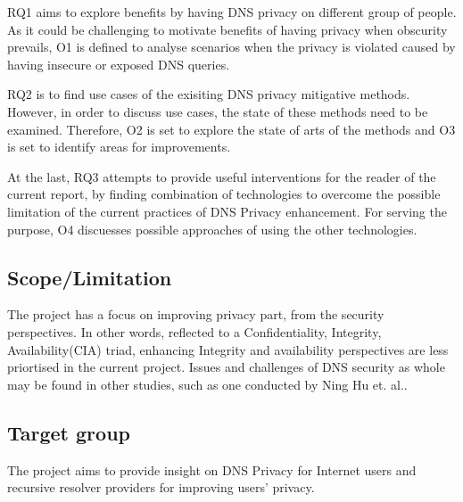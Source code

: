 \documentclass[a4paper,12pt]{article}
\begin{document}
RQ1 aims to explore benefits by having DNS privacy on different group of people.
As it could be challenging to motivate benefits of having privacy when obscurity prevails, O1 is defined to analyse scenarios when the privacy is violated caused by having insecure or exposed DNS queries.

RQ2 is to find use cases of the exisiting DNS privacy mitigative methods. However, in order to discuss use cases, the state of these methods need to be examined. Therefore, O2 is set to explore the state of arts of the methods and O3 is set to identify areas for  improvements.

At the last, RQ3 attempts to provide useful interventions for the reader of the current report, by finding combination of technologies to overcome the possible limitation of the current practices of DNS Privacy enhancement. For serving the purpose, O4 discuesses possible approaches of using the other technologies.

\subsection{Scope/Limitation}
The project has a focus on improving privacy part, from the security perspectives. In other words, reflected to a Confidentiality, Integrity, Availability(CIA) triad, enhancing Integrity and availability perspectives are less priortised in the current project. Issues and challenges of DNS security as whole may be found in other studies, such as one conducted by Ning Hu et. al.\cite{ning2017dnssecurity}. 


\subsection{Target group}
The project aims to provide insight on DNS Privacy for Internet users and recursive resolver providers for improving users' privacy.
\end{document}
